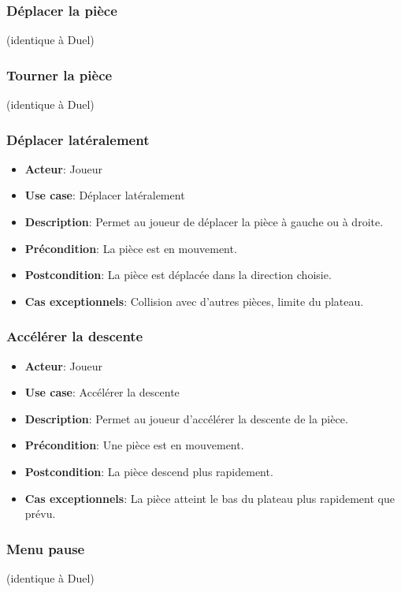 \documentclass{article}
\begin{document}
\subsubsection*{Déplacer la pièce} (identique à Duel)
\subsubsection*{Tourner la pièce} (identique à Duel)

\subsubsection*{Déplacer latéralement}
\begin{itemize}
    \item \textbf{Acteur}: Joueur
    \item \textbf{Use case}: Déplacer latéralement
    \item \textbf{Description}: Permet au joueur de déplacer la pièce à gauche ou à droite.
    \item \textbf{Précondition}: La pièce est en mouvement.
    \item \textbf{Postcondition}: La pièce est déplacée dans la direction choisie.
    \item \textbf{Cas exceptionnels}: Collision avec d'autres pièces, limite du plateau.
\end{itemize}

\subsubsection*{Accélérer la descente}
\begin{itemize}
    \item \textbf{Acteur}: Joueur
    \item \textbf{Use case}: Accélérer la descente
    \item \textbf{Description}: Permet au joueur d'accélérer la descente de la pièce.
    \item \textbf{Précondition}: Une pièce est en mouvement.
    \item \textbf{Postcondition}: La pièce descend plus rapidement.
    \item \textbf{Cas exceptionnels}: La pièce atteint le bas du plateau plus rapidement que prévu.
\end{itemize}

\subsubsection*{Menu pause} (identique à Duel)
\end{document}
